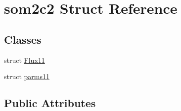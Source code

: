 \hypertarget{structsom2c2}{\section{som2c2 Struct Reference}
\label{structsom2c2}
}
\subsection*{Classes}
\begin{DoxyCompactItemize}
\item 
struct \hyperlink{structsom2c2_1_1_flux11}{Flux11}
\item 
struct \hyperlink{structsom2c2_1_1parms11}{parms11}
\end{DoxyCompactItemize}
\subsection*{Public Attributes}
